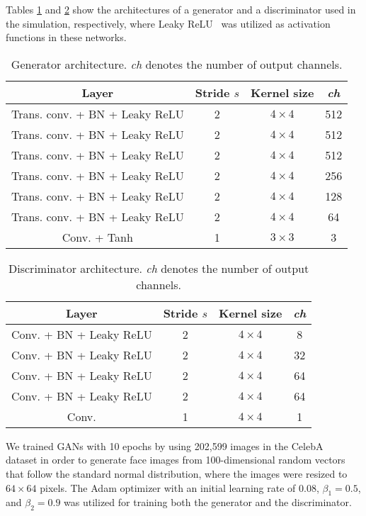 \documentclass{article}
\newcounter{num}
\begin{document}
  Tables \ref{tab:generator} and \ref{tab:discriminator} show
  the architectures of a generator and a discriminator used in the simulation,
  respectively,
  where Leaky ReLU~\cite{xu2015empirical} was utilized as activation functions
  in these networks.
  \begin{table}[!t]
    \centering
    \footnotesize
    \caption{Generator architecture.
      \textit{ch} denotes the number of output channels.}
    \begin{tabular}{cccc} \hline\hline
      Layer & Stride $s$ & Kernel size & \textit{ch} \\ \hline
      Trans. conv. + BN + Leaky ReLU & 2 & $4 \times 4$ & 512 \\
      Trans. conv. + BN + Leaky ReLU & 2 & $4 \times 4$ & 512 \\
      Trans. conv. + BN + Leaky ReLU & 2 & $4 \times 4$ & 512 \\
      Trans. conv. + BN + Leaky ReLU & 2 & $4 \times 4$ & 256 \\
      Trans. conv. + BN + Leaky ReLU & 2 & $4 \times 4$ & 128 \\
      Trans. conv. + BN + Leaky ReLU & 2 & $4 \times 4$ & 64 \\
      Conv. + Tanh & 1 & $3 \times 3$ & 3 \\
      \hline
    \end{tabular}
    \label{tab:generator}
  \end{table}
  \begin{table}[!t]
    \centering
    \footnotesize
    \caption{Discriminator architecture.
      \textit{ch} denotes the number of output channels.}
    \begin{tabular}{cccc} \hline\hline
      Layer & Stride $s$ & Kernel size & \textit{ch} \\ \hline
      Conv. + BN + Leaky ReLU & 2 & $4 \times 4$ & 8 \\
      Conv. + BN + Leaky ReLU & 2 & $4 \times 4$ & 32 \\
      Conv. + BN + Leaky ReLU & 2 & $4 \times 4$ & 64 \\
      Conv. + BN + Leaky ReLU & 2 & $4 \times 4$ & 64 \\
      Conv. & 1 & $4 \times 4$ & 1 \\
      \hline
    \end{tabular}
    \label{tab:discriminator}
  \end{table}
  We trained GANs with 10 epochs by using 202,599 images in the CelebA~\cite{liu2015deep} dataset
  in order to generate face images from 100-dimensional random vectors that follow
  the standard normal distribution,
  where the images were resized to $64 \times 64$ pixels.
  The Adam optimizer \cite{kingma2014adam}
  with an initial learning rate of 0.08, $\beta_1=0.5$, and $\beta_2=0.9$
  was utilized for training both the generator and the discriminator.
\end{document}

